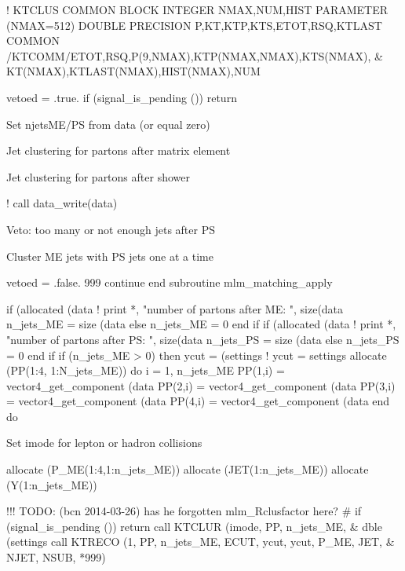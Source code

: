     ! KTCLUS COMMON BLOCK
    INTEGER NMAX,NUM,HIST
    PARAMETER (NMAX=512)
    DOUBLE PRECISION P,KT,KTP,KTS,ETOT,RSQ,KTLAST
    COMMON /KTCOMM/ETOT,RSQ,P(9,NMAX),KTP(NMAX,NMAX),KTS(NMAX), &
         KT(NMAX),KTLAST(NMAX),HIST(NMAX),NUM

    vetoed = .true.
    if (signal_is_pending ())  return

    \LA{}Set \code{}n{}jets{}ME/PS\edoc{} from \code{}data\edoc{} (or equal zero)\RA{}

    \LA{}Jet clustering for partons after matrix element\RA{}

    \LA{}Jet clustering for partons after shower\RA{}

    ! call data_write(data)

    \LA{}Veto: too many or not enough jets after PS\RA{}

    \LA{}Cluster ME jets with PS jets one at a time\RA{}

    vetoed = .false.
999 continue
  end subroutine mlm_matching_apply

\eatline
\nwendcode{}\nwdocspar
\nwenddocs{}\endmoddef
if (allocated (data%
   ! print *, "number of partons after ME: ", size(data%
   n_jets_ME = size (data%
else
   n_jets_ME = 0
end if
if (allocated (data%
   ! print *, "number of partons after PS: ", size(data%
   n_jets_PS = size (data%
else
   n_jets_PS = 0
end if
\nwendcode{}\nwdocspar
\nwenddocs{}\endmoddef
if (n_jets_ME > 0) then
   ycut = (settings%
   ! ycut = settings%
   allocate (PP(1:4, 1:N_jets_ME))
   do i = 1, n_jets_ME
      PP(1,i) = vector4_get_component (data%
      PP(2,i) = vector4_get_component (data%
      PP(3,i) = vector4_get_component (data%
      PP(4,i) = vector4_get_component (data%
   end do

   \LA{}Set \code{}imode\edoc{} for lepton or hadron collisions\RA{}

   allocate (P_ME(1:4,1:n_jets_ME))
   allocate (JET(1:n_jets_ME))
   allocate (Y(1:n_jets_ME))

!!! TODO: (bcn 2014-03-26) has he forgotten mlm_Rclusfactor here? #
   if (signal_is_pending ())  return
   call KTCLUR (imode, PP, n_jets_ME, &
        dble (settings%
   call KTRECO (1, PP, n_jets_ME, ECUT, ycut, ycut, P_ME, JET, &
        NJET, NSUB, *999)


